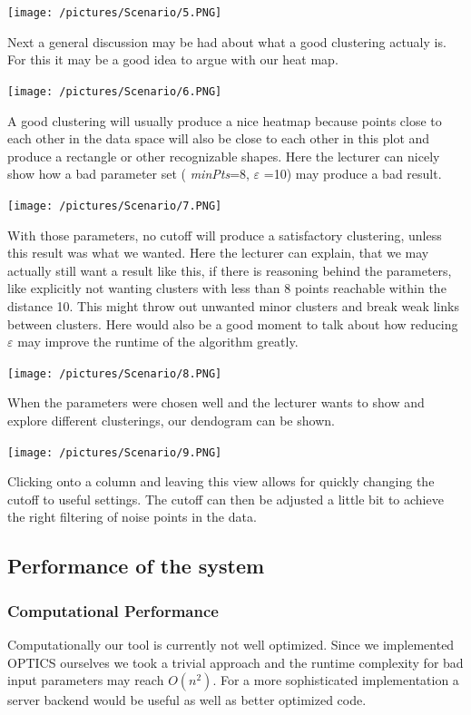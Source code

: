 \documentclass{vgtc} %
\begin{document}
\noindent
\texttt{[image: /pictures/Scenario/5.PNG]}

Next a general discussion may be had about what a good clustering actualy is. For this it may be a good idea to argue with our heat map.

\noindent
\texttt{[image: /pictures/Scenario/6.PNG]}

A good clustering will usually produce a nice heatmap because points close to each other in the data space will also be close to each other in this plot and produce a rectangle or other recognizable shapes. Here the lecturer can nicely show how a bad parameter set ( \emph{minPts}=8, $\varepsilon$ =10) may produce a bad result.

\noindent
\texttt{[image: /pictures/Scenario/7.PNG]}

With those parameters, no cutoff will produce a satisfactory clustering, unless this result was what we wanted. Here the lecturer can explain, that we may actually still want a result like this, if there is reasoning behind the parameters, like explicitly not wanting clusters with less than 8 points reachable within the distance 10. This might throw out unwanted minor clusters and break weak links between clusters. Here would also be a good moment to talk about how reducing $\varepsilon$ may improve the runtime of the algorithm greatly.

\noindent
\texttt{[image: /pictures/Scenario/8.PNG]}

When the parameters were chosen well and the lecturer wants to show and explore different clusterings, our dendogram can be shown.

\noindent
\texttt{[image: /pictures/Scenario/9.PNG]}

Clicking onto a column and leaving this view allows for quickly changing the cutoff to useful settings. The cutoff can then be adjusted a little bit to achieve the right filtering of noise points in the data.

\subsection{Performance of the system}
\subsubsection{Computational Performance}

Computationally our tool is currently not well optimized. Since we implemented OPTICS ourselves we took a trivial approach and the runtime complexity for bad input parameters may reach $ O(n^{2}) $. For a more sophisticated implementation a server backend would be useful as well as better optimized code.
\end{document}
